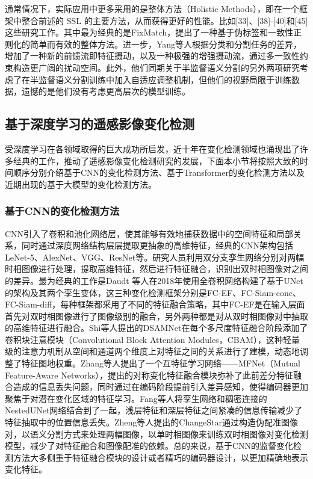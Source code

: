 \documentclass[lang=chs, degree=master, blindreview=false, adobe=false]{yanputhesis}
\begin{document}
通常情况下，实际应用中更多采用的是整体方法（Holistic Methods），即在一个框架中整合前述的 SSL 的主要方法，从而获得更好的性能。比如[33]、[38]-[40]和[45]这些研究工作。其中最为经典的是FixMatch\cite{sohn2020fixmatch}，提出了一种基于伪标签和一致性正则化的简单而有效的整体方法。进一步，Yang等人根据分类和分割任务的差异，增加了一种新的前馈流即特征摄动，以及一种极强的增强摄动流，通过多一致性约束构造更广阔的扰动空间。此外，他们同期关于半监督语义分割的另外两项研究考虑了在半监督语义分割训练中加入自适应调整机制，但他们的视野局限于训练数据，遗憾的是他们没有考虑更高层次的模型训练。

\subsection{基于深度学习的遥感影像变化检测}
受深度学习在各领域取得的巨大成功所启发，近十年在变化检测领域也涌现出了许多经典的工作，推动了遥感影像变化检测研究的发展，下面本小节将按照大致的时间顺序分别介绍基于CNN的变化检测方法、基于Transformer的变化检测方法以及近期出现的基于大模型的变化检测方法。
\subsubsection{基于CNN的变化检测方法}
CNN引入了卷积和池化网络层，使其能够有效地捕获数据中的空间特征和局部关系，同时通过深度网络结构层层提取更抽象的高维特征，经典的CNN架构包括LeNet-5、AlexNet、VGG、ResNet等。研究人员利用双分支孪生网络分别对两幅时相图像进行处理，提取高维特征，然后进行特征融合，识别出双时相图像对之间的差异。最为经典的工作是Daudt 等人\cite{daudt2018FC-EF}在2018年使用全卷积网络构建了基于UNet的架构及其两个孪生变体，这三种变化检测框架分别是FC-EF、FC-Siam-conc、FC-Siam-diff，每种框架都采用了不同的特征融合策略，其中FC-EF是在输入层面首先对双时相图像进行了图像级别的融合，另外两种都是对从双时相图像对中抽取的高维特征进行融合。Shi等人\cite{shi2021DSAMNet}提出的DSAMNet在每个多尺度特征融合阶段添加了卷积块注意模块（Convolutional Block Attention Modules，CBAM），这种轻量级的注意力机制从空间和通道两个维度上对特征之间的关系进行了建模，动态地调整了特征图地权重。Zhang等人\cite{zhang2023MFNet}提出了一个互特征学习网络——MFNet（Mutual Feature-Aware Networks），提出的对称变化特征融合模块弥补了此前差分特征融合造成的信息丢失问题，同时通过在编码阶段提前引入差异感知，使得编码器更加聚焦于对潜在变化区域的特征学习。Fang等人\cite{fang2021SNUNet}将孪生网络和稠密连接的NestedUNet网络结合到了一起，浅层特征和深层特征之间紧凑的信息传输减少了特征抽取中的位置信息丢失。Zheng等人提出的ChangeStar\cite{zheng2021changestar}通过构造伪配准图像对，以语义分割方式来处理两幅图像，以单时相图像来训练双时相图像对变化检测模型，减少了对特征融合和图像配准的依赖。总的来说，基于CNN的监督变化检测方法大多侧重于特征融合模块的设计或者精巧的编码器设计，以更加精确地表示变化特征。
\end{document}
